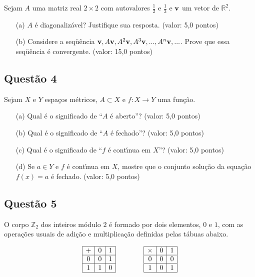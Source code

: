 \documentclass{report}
\begin{document}
Sejam $A$ uma matriz real $2 \times 2$ com autovalores $\frac1{2}$ e $\frac1{3}$ e $\textbf v$ um vetor de $\mathbb R^2$.

\begin{enumerate}

\item[(a)] $A$ \'e diagonaliz\'avel? Justifique sua resposta. (valor: 5,0 pontos)

\item[(b)] Considere a seqü\^encia $\textbf v , A\textbf v , A^2\textbf v , A^3\textbf v , ... , A^n\textbf v , ... $. Prove que essa seqü\^encia \'e convergente. (valor: 15,0 pontos)

\end{enumerate}

\subsection{\color{blue} Quest\~ao 4}

Sejam $X$ e $Y$ espa\c cos m\'etricos, $A \subset X$ e $f: X \to Y$ uma fun\c c\~ao.

\begin{enumerate}

\item[(a)] Qual \'e o significado de “$A$ \'e aberto”? (valor: 5,0 pontos)

\item[(b)] Qual \'e o significado de “$A$ \'e fechado”? (valor: 5,0 pontos)

\item[(c)] Qual \'e o significado de “$f$ \'e cont\'\i nua em $X$”? (valor: 5,0 pontos)

\item[(d)] Se $a \in Y$ e $f$ \'e cont\'\i nua em $X$, mostre que o conjunto solu\c c\~ao da equa\c c\~ao $f(x) = a$ \'e fechado. (valor: 5,0 pontos)

\end{enumerate}

\subsection{\color{blue} Quest\~ao 5}

O corpo $\mathbb Z_2$ dos inteiros m\'odulo $2$ \'e formado por dois elementos, $0$ e $1$, com as opera\c c\~oes usuais de adi\c c\~ao e multiplica\c c\~ao definidas pelas t\'abuas abaixo.

$$\begin{array}{|c|c|c|}
\hline + & 0 & 1 \\
\hline 0 & 0 & 1 \\
\hline 1 & 1 & 0 \\
\hline
\end{array} \qquad \qquad
\begin{array}{|c|c|c|}
\hline \times & 0 & 1 \\
\hline 0 & 0 & 0 \\
\hline 1 & 0 & 1 \\
\hline
\end{array}$$
\end{document}
